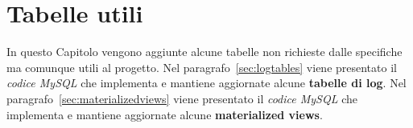 \chapter{Tabelle utili}
In questo Capitolo vengono aggiunte alcune tabelle non richieste dalle specifiche ma
comunque utili al progetto. Nel paragrafo~\vref{sec:logtables} viene presentato il
{\it codice MySQL} che implementa e mantiene aggiornate alcune {\bf tabelle di log}. Nel
paragrafo~\vref{sec:materializedviews} viene presentato il {\it codice MySQL} che implementa
e mantiene aggiornate alcune {\bf materialized views}.


